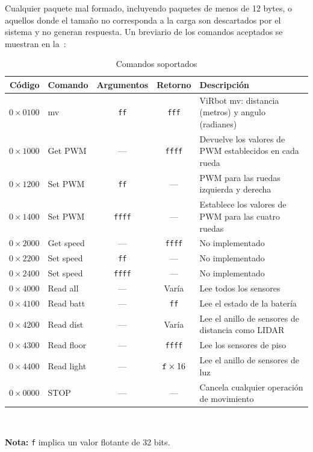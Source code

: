 \documentclass[letterpaper,10.5pt]{article}
\begin{document}
Cualquier paquete mal formado, incluyendo paquetes de menos de 12 bytes, o aquellos donde el tamaño no corresponda a la carga son descartados por el sistema y no generan respuesta. Un breviario de los comandos aceptados se muestran en la~:

\begin{table}
	\centering
	\caption{Comandos soportados}%
	\label{tbl:commands}
	\newcommand{\timesf}[1]{$\text{\texttt{f}}\times#1$}
	\begin{tabularx}{0.95\linewidth}{r l c c X}
		\toprule
		Código              & Comando   & Argumentos    & Retorno       & Descripción \\
		\midrule
			\(0\times0100\) & mv        & \texttt{ff}   & \texttt{fff}  & ViRbot mv: distancia (metros) y angulo (radianes) \\
			\(0\times1000\) & Get PWM   &      ---      & \texttt{ffff} & Devuelve los valores de PWM establecidos en cada rueda\\
			\(0\times1200\) & Set PWM   & \texttt{ff}   &      ---      & PWM para las ruedas izquierda y derecha \\
			\(0\times1400\) & Set PWM   & \texttt{ffff} &      ---      & Establece los valores de PWM para las cuatro ruedas \\
			\(0\times2000\) & Get speed &      ---      & \texttt{ffff} & No implementado \\
			\(0\times2200\) & Set speed & \texttt{ff}   &      ---      & No implementado \\
			\(0\times2400\) & Set speed & \texttt{ffff} &      ---      & No implementado \\
			\(0\times4000\) & Read all  &      ---      &     Varía     & Lee todos los sensores\\
			\(0\times4100\) & Read batt &      ---      & \texttt{ff}   & Lee el estado de la batería\\
			\(0\times4200\) & Read dist &      ---      &     Varía     & Lee el anillo de sensores de distancia como LIDAR\\
			\(0\times4300\) & Read floor&      ---      & \texttt{ffff} & Lee los sensores de piso\\
			\(0\times4400\) & Read light&      ---      & \timesf{16}   & Lee el anillo de sensores de luz\\
			\(0\times0000\) & STOP      &      ---      &      ---      & Cancela cualquier operación de movimiento\\
		\bottomrule
	\end{tabularx}
	\\[1em]\raggedright
	\noindent\textbf{Nota:} \texttt{f} implica un valor flotante de 32 bits.
\end{table}
\end{document}
